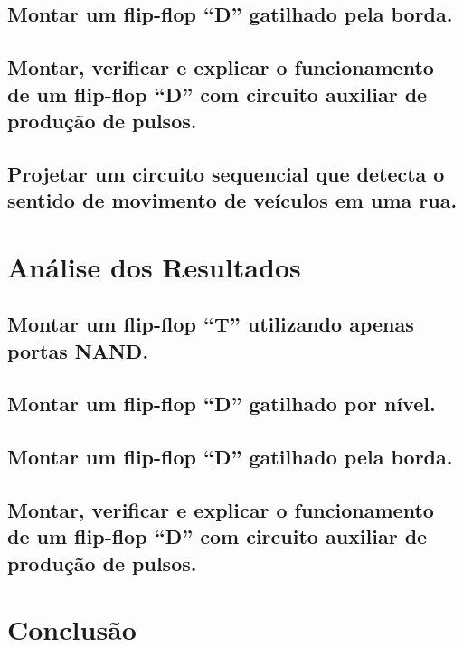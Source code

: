 \documentclass[12pt]{article}
\begin{document}
	
	\subsection{Montar um flip-flop “D” gatilhado pela borda.}
	\label{2.3}
	

	\subsection{Montar, verificar e explicar o funcionamento de um flip-flop “D” com circuito auxiliar de produção de pulsos.}
	\label{2.4}
	

	
	\subsection{Projetar um circuito sequencial que detecta o sentido de movimento de veículos em uma rua.}
	\label{2.5}
	
	 
	
	
	
	\section{Análise dos Resultados}
	\label{sec:Resultados}
	
	\subsection{Montar um flip-flop “T” utilizando apenas portas NAND.}

	
	\subsection{Montar um flip-flop “D” gatilhado por nível.}
	
	
	\subsection{Montar um flip-flop “D” gatilhado pela borda.}
	

	
	
	\subsection{Montar, verificar e explicar o funcionamento de um flip-flop “D” com circuito auxiliar de produção de pulsos.}

	
	
	\section{Conclusão}
	\label{sec:Conclusao}
	
\end{document}
